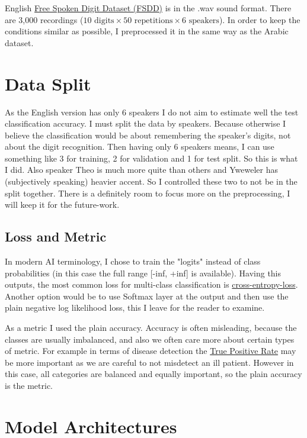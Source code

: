 \documentclass[a4paper,10pt]{article}
\begin{document}
English \href{https://github.com/Jakobovski/free-spoken-digit-dataset}{Free Spoken Digit Dataset (FSDD)}
is in the .wav sound format. There are 3,000 recordings ($10 \textrm{ digits} \times 50 \textrm{ repetitions} \times 6 \textrm{ speakers}$).
In order to keep the conditions similar as possible,
I preprocessed it in the same way as the Arabic dataset.

\section{Data Split}

As the English version has only 6 speakers I do not aim to estimate well the test classification accuracy.
I must split the data by speakers.
Because otherwise I believe the classification would be about remembering the speaker's digits, not about the digit recognition.
Then having only 6 speakers means, I can use something like 3 for training, 2 for validation and 1 for test split.
So this is what I did.
Also speaker Theo is much more quite than others and Yweweler has (subjectively speaking) heavier accent.
So I controlled these two to not be in the split together.
There is a definitely room to focus more on the preprocessing, I will keep it for the future-work.

\subsection{Loss and Metric}

In modern AI terminology, I chose to train the "logits" instead of class probabilities (in this case the full range [-inf, +inf] is available).
Having this outputs, the most common loss for multi-class classification is \href{https://pytorch.org/docs/stable/generated/torch.nn.CrossEntropyLoss.html}{cross-entropy-loss}.
Another option would be to use Softmax layer at the output and then use the plain negative log likelihood loss, this I leave for the reader to examine.

As a metric I used the plain accuracy. Accuracy is often misleading, because the classes are usually imbalanced, and also we often care more about certain types of metric.
For example in terms of disease detection the \href{https://en.wikipedia.org/wiki/Confusion_matrix}{True Positive Rate}
may be more important as we are careful to not misdetect an ill patient.
However in this case, all categories are balanced and equally important, so the plain accuracy is the metric.

\section{Model Architectures}
\end{document}
